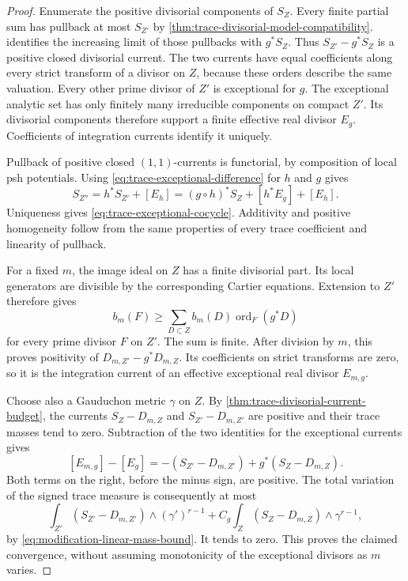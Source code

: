 \begin{proof}
Enumerate the positive divisorial components of $S_Z$. Every finite partial sum has pullback at most $S_{Z'}$ by \cref{thm:trace-divisorial-model-compatibility}.  identifies the increasing limit of those pullbacks with $g^*S_Z$. Thus $S_{Z'}-g^*S_Z$ is a positive closed divisorial current. The two currents have equal coefficients along every strict transform of a divisor on $Z$, because these orders describe the same valuation. Every other prime divisor of $Z'$ is exceptional for $g$. The exceptional analytic set has only finitely many irreducible components on compact $Z'$. Its divisorial components therefore support a finite effective real divisor $E_g$. Coefficients of integration currents identify it uniquely.

Pullback of positive closed $(1,1)$-currents is functorial, by composition of local psh potentials. Using \eqref{eq:trace-exceptional-difference} for $h$ and $g$ gives
\[
 S_{Z''}=h^*S_{Z'}+[E_h]
        =(g\circ h)^*S_Z+[h^*E_g]+[E_h].
\]
Uniqueness gives \eqref{eq:trace-exceptional-cocycle}. Additivity and positive homogeneity follow from the same properties of every trace coefficient and linearity of pullback.

For a fixed $m$, the image ideal on $Z$ has a finite divisorial part. Its local generators are divisible by the corresponding Cartier equations. Extension to $Z'$ therefore gives
\[
 b_m(F)\geq\sum_{D\subset Z}
                    b_m(D)\operatorname{ord}_F(g^*D)
\]
for every prime divisor $F$ on $Z'$. The sum is finite. After division by $m$, this proves positivity of $D_{m,Z'}-g^*D_{m,Z}$. Its coefficients on strict transforms are zero, so it is the integration current of an effective exceptional real divisor $E_{m,g}$.

Choose also a Gauduchon metric $\gamma$ on $Z$. By \cref{thm:trace-divisorial-current-budget}, the currents $S_Z-D_{m,Z}$ and $S_{Z'}-D_{m,Z'}$ are positive and their trace masses tend to zero. Subtraction of the two identities for the exceptional currents gives
\[
 [E_{m,g}]-[E_g]
   =-(S_{Z'}-D_{m,Z'})+g^*(S_Z-D_{m,Z}).
\]
Both terms on the right, before the minus sign, are positive. The total variation of the signed trace measure is consequently at most
\[
 \int_{Z'}(S_{Z'}-D_{m,Z'})\wedge(\gamma')^{r-1}
 +C_g\int_Z(S_Z-D_{m,Z})\wedge\gamma^{r-1},
\]
by \eqref{eq:modification-linear-mass-bound}. It tends to zero. This proves the claimed convergence, without assuming monotonicity of the exceptional divisors as $m$ varies.
\end{proof}

